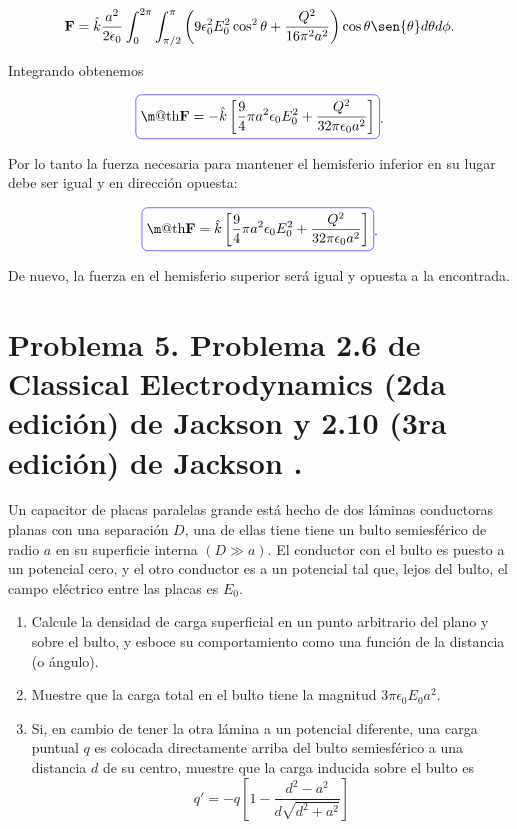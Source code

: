 \documentclass[a4paper,10pt]{article}
\makeatletter
\numberwithin{equation}{section}
\newcommand*{\boxcolor}{blue}
\renewcommand{\boxed}[1]{\textcolor{\boxcolor}{%
\tikz[baseline={([yshift=-1ex]current bounding box.center)}] \node [rectangle, minimum width=1ex,rounded corners,draw] {\normalcolor\m@th$\displaystyle#1$};}}
\makeatother
\begin{document}
\begin{equation}
 \mathbf{F} = \hat{k} \frac{a^2}{2\epsilon_0}\int_0^{2\pi} \int_{\pi/2}^\pi
 \left(9\epsilon_0^2E_0^2 \cos^2{\theta} 
 + \frac{Q^2}{16\pi^2a^2}\right)\cos{\theta}\sen{\theta}
 d\theta d\phi.
\end{equation}

Integrando obtenemos 

\begin{equation}
 \boxed{\mathbf{F} = - \hat{k}\left[\frac{9}{4}\pi a^2 \epsilon_0 E_0^2 +
 \frac{Q^2}{32\pi\epsilon_0 a^2}\right]}.
\end{equation}

Por lo tanto la fuerza necesaria para mantener el hemisferio inferior en su lugar 
debe ser igual y en dirección opuesta:

\begin{equation}
 \boxed{\mathbf{F} = \hat{k}\left[\frac{9}{4}\pi a^2 \epsilon_0 E_0^2 +
 \frac{Q^2}{32\pi\epsilon_0 a^2}\right]}.
\end{equation}

De nuevo, la fuerza en el hemisferio superior será igual y opuesta a la encontrada. 

\section{Problema 5. Problema 2.6 de Classical Electrodynamics (2da edición) de Jackson 
\cite{jackson2} y 2.10 (3ra edición) de Jackson \cite{jackson3}.}

Un capacitor de placas paralelas grande está hecho de dos láminas conductoras 
planas con una separación $D$, una de ellas tiene tiene un bulto semiesférico 
de radio $a$ en su superficie interna $(D \gg a)$. El conductor con el bulto 
es puesto a un potencial cero, y el otro conductor es a un potencial tal que, 
lejos del bulto, el campo eléctrico entre las placas es $E_0$.

\begin{enumerate}[label=\textbf{(\alph*)}]
 \item Calcule la densidad de carga superficial en un punto arbitrario del 
 plano y sobre el bulto, y esboce su comportamiento como una función de la distancia 
 (o ángulo).
 \item Muestre que la carga total en el bulto tiene la magnitud $3\pi\epsilon_0E_0a^2$.
 \item Si, en cambio de tener la otra lámina a un potencial diferente, una carga 
 puntual $q$ es colocada directamente arriba del bulto semiesférico a una distancia 
 $d$ de su centro, muestre que la carga inducida sobre el bulto es 
 $$
 q' = -q\left[1 - \frac{d^2 - a^2}{d\sqrt{d^2 + a^2}} \right]
 $$
\end{enumerate}
\end{document}
